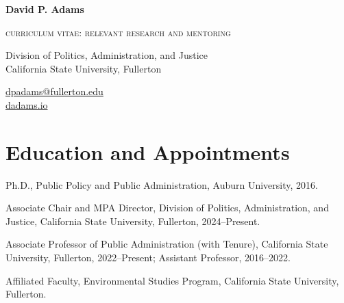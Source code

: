 \documentclass[12pt,letterpaper]{article}
\def\name{David P. Adams}
\renewenvironment{itemize}{
  \begin{list}{}{
    \setlength{\leftmargin}{1.5em}
    \setlength{\itemsep}{0pt}\setlength{\topsep}{0pt}
    \setlength{\parskip}{0pt}
    \setlength{\parsep}{0.08em}
  }
}{
  \end{list}
}
\begin{document}
\centerline{\large \bf \name}
\smallskip
\centerline{\small{\textsc{curriculum vitae: relevant research and mentoring}}}

\medskip
\noindent
\begin{minipage}[t]{0.6\textwidth}
    Division of Politics, Administration, and Justice \\
    California State University, Fullerton
\end{minipage}
\hfill
\begin{minipage}[t]{0.38\textwidth}
    \raggedleft
    \href{mailto:dpadams@fullerton.edu}{dpadams@fullerton.edu} \\
    \href{https://dadams.io}{dadams.io}
\end{minipage}

\section*{Education and Appointments}
\begin{itemize}\leftmargin=2pt\itemindent=-15pt
  \item Ph.D., Public Policy and Public Administration, Auburn University, 2016.
  \item Associate Chair and MPA Director, Division of Politics, Administration, and Justice, California State University, Fullerton, 2024--Present.
  \item Associate Professor of Public Administration (with Tenure), California State University, Fullerton, 2022--Present; Assistant Professor, 2016--2022.
  \item Affiliated Faculty, Environmental Studies Program, California State University, Fullerton.
\end{itemize}
\end{document}
